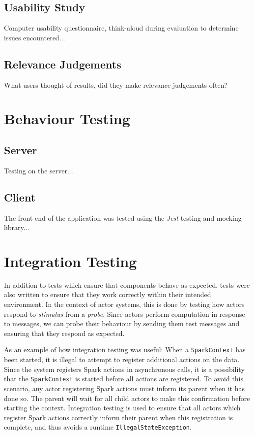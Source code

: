 \documentclass{l4proj}
\newcommand{\code}[1]{\texttt{#1}}
\begin{document}
    \subsection{Usability Study}
    Computer usability questionnaire, think-aloud during evaluation to determine issues encountered...
    
    \subsection{Relevance Judgements}
    What users thought of results, did they make relevance judgements often?

\section{Behaviour Testing}
    \subsection{Server}
    Testing on the server...
    
    \subsection{Client}
        The front-end of the application was tested using the \textit{Jest} testing and mocking library...
        
        
\section{Integration Testing}
    In addition to tests which ensure that components behave as expected, tests were also written to ensure that they work correctly within their intended environment. In the context of actor systems, this is done by testing how actors respond to \textit{stimulus} from a \textit{probe}. Since actors perform computation in response to messages, we can probe their behaviour by sending them test messages and ensuring that they respond as expected.
    
    As an example of how integration testing was useful: When a \code{SparkContext} has been started, it is illegal to attempt to register additional actions on the data. Since the system registers Spark actions in asynchronous calls, it is a possibility that the \code{SparkContext} is started before all actions are registered. To avoid this scenario, any actor registering Spark actions must inform its parent when it has done so. The parent will wait for all child actors to make this confirmation before starting the context. Integration testing is used to ensure that all actors which register Spark actions correctly inform their parent when this registration is complete, and thus avoids a runtime \code{IllegalStateException}.
    
\end{document}
